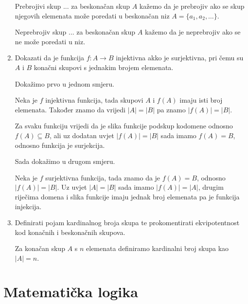 \documentclass{article}
\begin{document}
\begin{enumerate}
Prebrojivi skup ... za beskonačan skup $A$ kažemo da je prebrojiv ako se skup njegovih elemenata može poredati u beskonačan niz $ A = \{a_1, a_2, \ldots\}$.

Neprebrojiv skup ... za beskonačan skup $A$ kažemo da je neprebrojiv ako se ne može poredati u niz.

\item Dokazati da je funkcija $f: A \to B$ injektivna akko je surjektivna, pri čemu su $A$ i $B$ konačni skupovi s jednakim brojem elemenata.

Dokažimo prvo u jednom smjeru.

Neka je $f$ injektivna funkcija, tada skupovi $A$ i $f(A)$ imaju isti broj elemenata. Također znamo da vrijedi $|A| = |B|$ pa znamo $|f(A)| = |B|$.

Za svaku funkciju vrijedi da je slika funkcije podskup kodomene odnosno $f(A)\subseteq B$, ali uz dodatan uvjet $|f(A)| = |B|$ sada imamo $f(A) = B$, odnosno funkcija je surjekcija.

Sada dokažimo u drugom smjeru.

Neka je $f$ surjektivna funkcija, tada znamo da je $f(A) = B$, odnosno $|f(A)| = |B|$. Uz uvjet $|A| = |B|$ sada imamo $|f(A)|=|A|$, drugim riječima domena i slika funkcije imaju jednak broj elemenata pa je funkcija injekcija.

\item Definirati pojam kardinalnog broja skupa te prokomentirati ekvipotentnost kod konačnih i beskonačnih skupova.

Za konačan skup $A$ s $n$ elemenata definiramo kardinalni broj skupa kao $|A| = n$.

\end{enumerate}

\color{brightlavender}
\section{Matematička logika}
\color{white}
\end{document}
